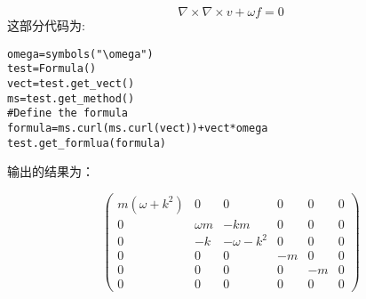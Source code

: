 \documentclass[UTF8]{article}
\begin{document}
\begin{equation}
\nabla \times \nabla \times v+\omega f=0
\end{equation}
这部分代码为:
\begin{lstlisting}
omega=symbols("\omega")
test=Formula()
vect=test.get_vect()
ms=test.get_method()
#Define the formula
formula=ms.curl(ms.curl(vect))+vect*omega
test.get_formlua(formula)

\end{lstlisting}
输出的结果为：

\begin{equation}
\left(
\begin{array}{ccc}
m \left(\omega + k^{2}\right) & 0 & 0 & 0 & 0 & 0\\
0 & \omega m & - k m & 0 & 0 & 0\\0 & - k & - \omega - k^{2} & 0 & 0 & 0\\
0 & 0 & 0 & - m & 0 & 0\\0 & 0 & 0 & 0 & - m & 0\\
0 & 0 & 0 & 0 & 0 & 0
\end{array}
\right)
\end{equation}
\end{document}
